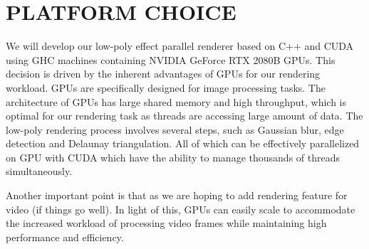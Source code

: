 \documentclass[12pt]{article}
\theoremstyle{definition}
\theoremstyle{plain}
\begin{document}
\bigskip
\section{PLATFORM CHOICE}
We will develop our low-poly effect parallel renderer based on C++ and CUDA using GHC machines containing
NVIDIA GeForce RTX 2080B GPUs. This decision is driven by the inherent advantages of GPUs for our rendering
workload. GPUs are specifically designed for image processing tasks. The architecture of GPUs has
large shared memory and high throughput, which is optimal for our rendering task as threads
are accessing large amount of data.  The low-poly rendering process involves several steps, such as Gaussian
blur, edge detection and Delaunay triangulation. All of which can be effectively parallelized on GPU with CUDA
which have the ability to manage thousands of threads simultaneously. 

Another important point is that as we are hoping to add rendering feature for video (if things go well).
In light of this, GPUs can easily scale to accommodate the increased workload of processing video frames while
maintaining high performance and efficiency. 

%


%
%
%
%
\end{document}
